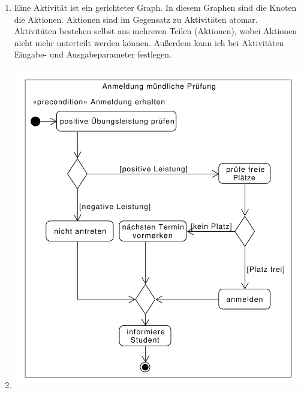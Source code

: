 \documentclass[a4paper, 12pt, margins=2.5cm]{homework}
\begin{document}
  

  \begin{problem}
    
  \end{problem}
  \begin{solution}\hfill
    \begin{enumerate}[label=\alph*)]\itemsep0pt
      \item Eine Aktivität ist ein gerichteter Graph. In diesem Graphen sind die
            Knoten die Aktionen. Aktionen sind im Gegensatz zu Aktivitäten atomar.
            Aktivitäten bestehen selbst aus mehreren Teilen (Aktionen), wobei 
            Aktionen nicht mehr unterteilt werden können. Außerdem kann ich bei
            Aktivitäten Eingabe- und Ausgabeparameter festlegen.

      \item \hfill
        \begin{center}
          \includegraphics[scale=0.6]{Aufgabe1b.pdf}
        \end{center}


\end{enumerate}
\end{solution}
\end{document}
